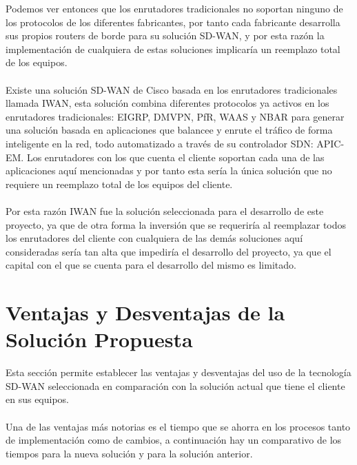 Podemos ver entonces que los enrutadores tradicionales no soportan ninguno de los protocolos de los diferentes fabricantes, por tanto cada fabricante desarrolla sus propios routers de borde para su solución SD-WAN, y por esta razón la implementación de cualquiera de estas soluciones implicaría un reemplazo total de los equipos.
\\
\\
Existe una solución SD-WAN de Cisco basada en los enrutadores tradicionales llamada IWAN, esta solución combina diferentes protocolos ya activos en los enrutadores tradicionales: EIGRP, DMVPN, PfR, WAAS y NBAR para generar una solución basada en aplicaciones que balancee y enrute el tráfico de forma inteligente en la red, todo automatizado a través de su controlador SDN: APIC-EM. Los enrutadores con los que cuenta el cliente soportan cada una de las aplicaciones aquí mencionadas y por tanto esta sería la única solución que no requiere un reemplazo total de los equipos del cliente.
\\
\\
Por esta razón IWAN fue la solución seleccionada para el desarrollo de este proyecto, ya que de otra forma la inversión que se requeriría al reemplazar todos los enrutadores del cliente con cualquiera de las demás soluciones aquí consideradas sería tan alta que impediría el desarrollo del proyecto, ya que el capital con el que se cuenta para el desarrollo del mismo es limitado.

\section{Ventajas y Desventajas de la Solución Propuesta} %
\label{sec:Ventajas y Desventajas de la Solución Propuesta}

Esta sección permite establecer las ventajas y desventajas del uso de la tecnología SD-WAN seleccionada en comparación con la solución actual que tiene el cliente en sus equipos.
\\
\\
Una de las ventajas más notorias es el tiempo que se ahorra en los procesos tanto de implementación como de cambios, a continuación hay un comparativo de los tiempos para la nueva solución y para la solución anterior.

